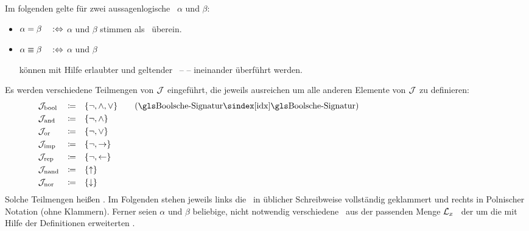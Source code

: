 Im folgenden gelte für zwei aussagenlogische \Formeln\ $\alpha$ und $\beta$:
\begin{itemize}
	\item[] $\alpha =    \beta \quad :\Leftrightarrow$ \quad $\alpha$ und $\beta$
	stimmen als \Zeichenkette\ überein.
	\item[] $\alpha \equiv \beta \quad :\Leftrightarrow$ \quad $\alpha$ und $\beta$
	\parbox[t]{11cm}{können mit Hilfe erlaubter  und geltender \Axiome\ --  -- ineinander überführt werden.}
\end{itemize}
%
Es werden verschiedene Teilmengen von $\mathcal{J}$ eingeführt, die jeweils ausreichen um alle anderen Elemente von $\mathcal{J}$ zu definieren:
\begin{align}
	& \alJun_\iBool & \defeq & \quad\{ \lnot, \land, \lor \} \label{def:Jbool}
	\qquad (\text{\BoolscheSignatur})
	\\
	& \alJun_\iAnd  & \defeq & \quad\{ \lnot, \land       \} \label{def:Jand}
	\\
	& \alJun_\iOr   & \defeq & \quad\{ \lnot, \lor        \} \label{def:Jor}
	\\
	& \alJun_\iImp  & \defeq & \quad\{ \lnot, \limp       \} \label{def:Jimp}
	\\
	& \alJun_\iRep  & \defeq & \quad\{ \lnot, \lrep       \} \label{def:Jrep}
	\\
	& \alJun_\iNand & \defeq & \quad\{ \lnand             \} \label{def:Jnand}
	\\
	& \alJun_\iNor  & \defeq & \quad\{ \lnor              \} \label{def:Jnor}
	\formulatoleft\formulatoleft\formulatoleft
\end{align}
Solche Teilmengen heißen \logischeSignatur.
%
Im Folgenden stehen jeweils links die \Formeln\ in üblicher Schreibweise vollständig geklammert und rechts in Polnischer Notation (ohne Klammern).
Ferner seien $\alpha$ und $\beta$ beliebige, nicht notwendig verschiedene \Formeln\ aus der passenden Menge $\mathcal{L}_x$ \textbzgl\ der um die mit Hilfe der Definitionen erweiterten \Formelmenge.

